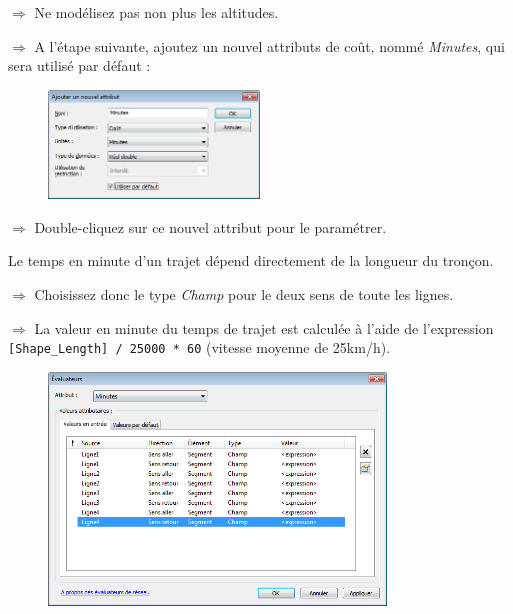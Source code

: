 \documentclass[11pt]{article}
\newcommand{\action}{$\Rightarrow$ }
\begin{document}
\action Ne modélisez pas non plus les altitudes.

\action A l'étape suivante, ajoutez un nouvel attributs de coût, nommé \textit{Minutes}, qui sera utilisé par défaut :
\begin{figure}[H]
	\center \includegraphics[width=0.5\textwidth]{img/td3b/network_analyst-5.png} \\
\end{figure}

\action Double-cliquez sur ce nouvel attribut pour le paramétrer.

Le temps en minute d'un trajet dépend directement de la longueur du tronçon.

\action Choisissez donc le type \textit{Champ} pour le deux sens de toute les lignes.

\action La valeur en minute du temps de trajet est calculée à l'aide de l'expression \texttt{[Shape\_Length] / 25000 * 60} (vitesse moyenne de 25km/h).
\begin{figure}[H]
	\center \includegraphics[width=0.8\textwidth]{img/td3b/network_analyst-6.png} \\
\end{figure}
\end{document}
